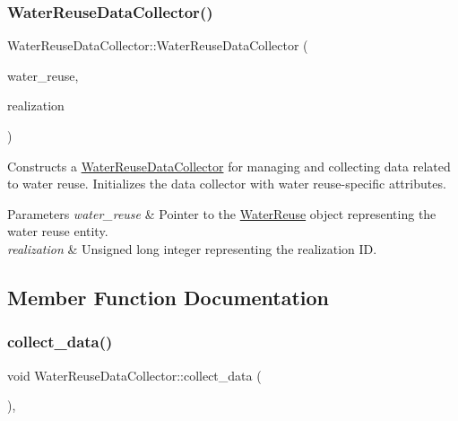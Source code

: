 \subsubsection{\texorpdfstring{Water\+Reuse\+Data\+Collector()}{WaterReuseDataCollector()}}
{\footnotesize\ttfamily Water\+Reuse\+Data\+Collector\+::\+Water\+Reuse\+Data\+Collector (\begin{DoxyParamCaption}\item[{\mbox{\hyperlink{classWaterReuse}{Water\+Reuse}} $\ast$}]{water\+\_\+reuse,  }\item[{unsigned long}]{realization }\end{DoxyParamCaption})}



Constructs a {\ttfamily \mbox{\hyperlink{classWaterReuseDataCollector}{Water\+Reuse\+Data\+Collector}}} for managing and collecting data related to water reuse. Initializes the data collector with water reuse-\/specific attributes. 


\begin{DoxyParams}{Parameters}
{\em water\+\_\+reuse} & Pointer to the {\ttfamily \mbox{\hyperlink{classWaterReuse}{Water\+Reuse}}} object representing the water reuse entity. \\
\hline
{\em realization} & Unsigned long integer representing the realization ID. \\
\hline
\end{DoxyParams}


\subsection{Member Function Documentation}
\mbox{\label{classWaterReuseDataCollector_af4d8d437372c06d84ff889a5288cc96e}} 
\subsubsection{\texorpdfstring{collect\+\_\+data()}{collect\_data()}}
{\footnotesize\ttfamily void Water\+Reuse\+Data\+Collector\+::collect\+\_\+data (\begin{DoxyParamCaption}{ }\end{DoxyParamCaption})\hspace{0.3cm}{\ttfamily [override]}, {\ttfamily [virtual]}}



